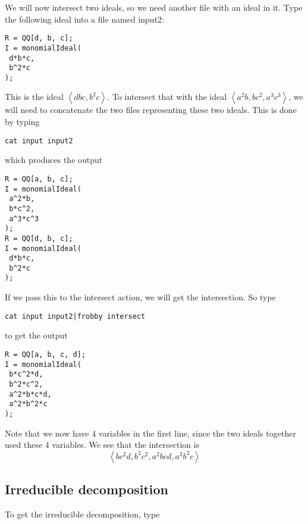 \documentclass{amsart}
\theoremstyle{definition}
\newcommand{\ideal}[1]{\left<#1\right>}
\begin{document}
We will now intersect two ideals, so we need another file with an
ideal in it. Type the following ideal into a file named input2:
\begin{verbatim}
R = QQ[d, b, c];
I = monomialIdeal(
 d*b*c,
 b^2*c
);
\end{verbatim}
This is the ideal $\ideal{dbc,b^2c}$. To intersect that with the ideal
$\ideal{a^2b,bc^2,a^3c^3}$, we will need to concatenate the two files
representing these two ideals. This is done by typing
\begin{verbatim}
cat input input2
\end{verbatim}
which produces the output
\begin{verbatim}
R = QQ[a, b, c];
I = monomialIdeal(
 a^2*b,
 b*c^2,
 a^3*c^3
);
R = QQ[d, b, c];
I = monomialIdeal(
 d*b*c,
 b^2*c
);
\end{verbatim}
If we pass this to the intersect action, we will get the intersection. So type
\begin{verbatim}
cat input input2|frobby intersect
\end{verbatim}
to get the output
\begin{verbatim}
R = QQ[a, b, c, d];
I = monomialIdeal(
 b*c^2*d,
 b^2*c^2,
 a^2*b*c*d,
 a^2*b^2*c
);
\end{verbatim}
Note that we now have 4 variables in the first line, since the two
ideals together used these 4 variables. We see that the intersection is
\[
\ideal{
 bc^2d,
 b^2c^2,
 a^2bcd,
 a^2b^2c}
\]

\subsection{Irreducible decomposition}

To get the irreducible decomposition, type
\end{document}
